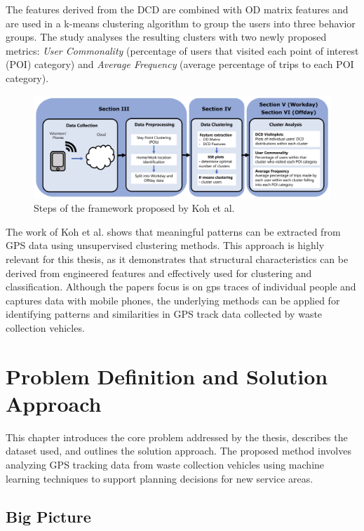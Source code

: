 \documentclass[a4paper,12pt,twoside]{scrreprt}
\begin{document}
The features derived from the DCD are combined with OD matrix
features
and are used in a k-means clustering algorithm to group the users into three
behavior groups. The study analyses the resulting clusters with two newly
proposed
metrics: \textit{User Commonality} (percentage of users that visited each
point of interest (POI) category) and \textit{Average Frequency} (average
percentage of trips to each POI category).~\cite{koh_clustering_2022}

\begin{figure}[htbp]
  \centering

  \includegraphics[width=\textwidth]{Figures/related_work/koh_clustering_framwork_flowchart.png}
  \caption{Steps of the framework proposed by Koh et
    al.~\cite{koh_clustering_2022}}
  \label{fig:koh_clustering_framework}
\end{figure}
\FloatBarrier

The work of Koh et al. shows that meaningful patterns can be extracted from GPS
data using unsupervised clustering methods. This approach is highly relevant
for this thesis,
as it demonstrates that structural characteristics can be derived from
engineered features
and effectively used for clustering and classification. Although the papers
focus is on
gps traces of individual people and captures data with mobile phones, the
underlying methods can
be applied for identifying patterns and similarities in GPS track data
collected by
waste collection vehicles.

\chapter{Problem Definition and Solution Approach}
This chapter introduces the core problem addressed by the thesis, describes the
dataset used, and outlines the solution approach. The proposed method involves
analyzing GPS tracking data from waste collection vehicles using machine
learning techniques to support planning decisions for new service areas.

\section{Big Picture}
\end{document}
